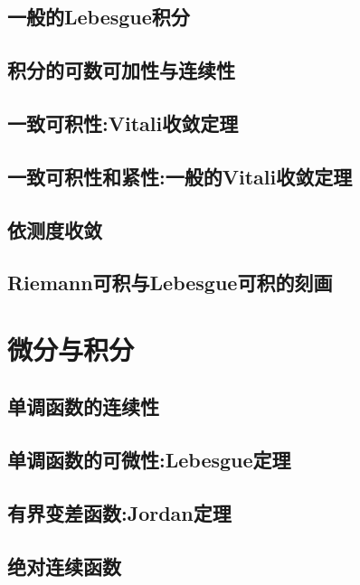 \documentclass[lang=cn,newtx,10pt,scheme=chinese]{../Template/elegantbook}
\begin{document}
\section{一般的Lebesgue积分}

\section{积分的可数可加性与连续性}

\section{一致可积性:Vitali收敛定理}

\section{一致可积性和紧性:一般的Vitali收敛定理}

\section{依测度收敛}

\section{Riemann可积与Lebesgue可积的刻画}






\chapter{微分与积分}


\section{单调函数的连续性}

\section{单调函数的可微性:Lebesgue定理}

\section{有界变差函数:Jordan定理}

\section{绝对连续函数}
\end{document}
